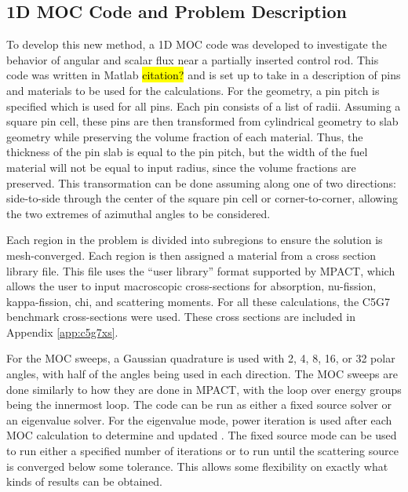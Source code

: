 \subsection{1D MOC Code and Problem Description}\label{ss:1dcode}

To develop this new method, a 1D MOC code was developed to investigate the behavior of angular and scalar flux near a partially inserted control rod.  This code was written in Matlab \hl{citation?} and is set up to take in a description of pins and materials to be used for the calculations.  For the geometry, a pin pitch is specified which is used for all pins.  Each pin consists of a list of radii.  Assuming a square pin cell, these pins are then transformed from cylindrical geometry to slab geometry while preserving the volume fraction of each material.  Thus, the thickness of the pin slab is equal to the pin pitch, but the width of the fuel material will not be equal to input radius, since the volume fractions are preserved.  This transormation can be done assuming along one of two directions: side-to-side through the center of the square pin cell or corner-to-corner, allowing the two extremes of azimuthal angles to be considered.

Each region in the problem is divided into subregions to ensure the solution is mesh-converged.  Each region is then assigned a material from a cross section library file.  This file uses the ``user library'' format supported by MPACT, which allows the user to input macroscopic cross-sections for absorption, nu-fission, kappa-fission, chi, and scattering moments.  For all these calculations, the C5G7 benchmark cross-sections \cite{EELewisC5G72003,EELewisC5G7extended2005} were used.  These cross sections are included in Appendix \ref{app:c5g7xs}.

For the MOC sweeps, a Gaussian quadrature \cite{HandbookOfMathFunctions1972} is used with 2, 4, 8, 16, or 32 polar angles, with half of the angles being used in each direction.  The MOC sweeps are done similarly to how they are done in MPACT, with the loop over energy groups being the innermost loop.  The code can be run as either a fixed source solver or an eigenvalue solver.  For the eigenvalue mode, power iteration is used after each MOC calculation to determine and updated \keff{}.  The fixed source mode can be used to run either a specified number of iterations or to run until the scattering source is converged below some tolerance.  This allows some flexibility on exactly what kinds of results can be obtained.

